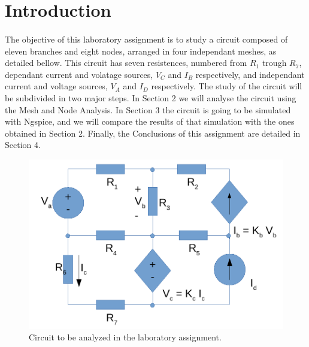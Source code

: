 \section{Introduction}
\label{sec:introduction}

\paragraph{} The objective of this laboratory assignment is to study a circuit composed of eleven branches and eight nodes, arranged in four independant meshes,
 as detailed bellow. This circuit has seven resistences, numbered from $R_1$ trough $R_7$, dependant current and volatage sources, $V_C$ and $I_B$ respectively,
 and independant current and voltage sources, $V_A$ and $I_D$ respectively.
The study of the circuit will be subdivided in two major steps. In Section 2 we will analyse the circuit using the Mesh and Node Analysis. In Section 3 the circuit is going to be simulated with Ngspice, and we will compare the results of that simulation with the ones obtained in Section 2.
Finally, the Conclusions of this assignment are detailed in Section 4.

\clearpage

\begin{figure}[h] \centering
\includegraphics[width=0.5\linewidth]{circuit.pdf}
\caption{Circuit to be analyzed in the laboratory assignment.}
\label{fig:rc}
\end{figure}

